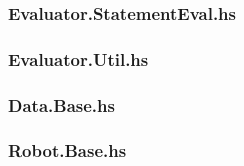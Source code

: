 \documentclass[a4paper,10pt]{article}
\begin{document}
    \subsubsection{Evaluator.StatementEval.hs}
      
    \subsubsection{Evaluator.Util.hs}
      
    \subsubsection{Data.Base.hs}
      
    \subsubsection{Robot.Base.hs}
      
  \restoregeometry
\end{document}
